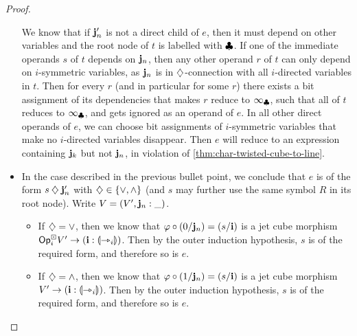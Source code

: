 \documentclass[a4paper]{memoir}
\begin{document}
\begin{proof}
\begin{itemize}
		We know that if $\mathbf{j}'_n$ is not a direct child of $e$, then it must depend on other variables and the root node of $t$ is labelled with $\mathbin{\clubsuit}$.
		If one of the immediate operands $s$ of $t$ depends on $\mathbf{j}_n$,
		then any other operand $r$ of $t$ can only depend on $i$-symmetric variables, as $\mathbf{j}_n$ is in $\mathbin{\diamondsuit}$-connection with all $i$-directed variables in $t$.
		Then for every $r$ (and in particular for some $r$) there exists a bit assignment of its dependencies that makes $r$ reduce to $\infty_{\mathbin{\clubsuit}}$, such that all of $t$ reduces to $\infty_{\mathbin{\clubsuit}}$, and gets ignored as an operand of $e$.
		In all other direct operands of $e$, we can choose bit assignments of $i$-symmetric variables that make no $i$-directed variables disappear.
		Then $e$ will reduce to an expression containing $\mathbf{j}_k$ but not $\mathbf{j}_n$, in violation of \cref{thm:char-twisted-cube-to-line}.
		
%		
%		
		
		\item In the case described in the previous bullet point, we conclude that $e$ is of the form $s \mathbin{\diamondsuit} \mathbf{j}_n'$ with ${\mathbin{\diamondsuit}} \in \mathopen{}\left\{ {\vee}, {\wedge} \right\}\mathclose{}$ (and $s$ may further use the same symbol $R$ in its root node).
		Write $V = (V', \mathbf{j}_n : \_)$.
		\begin{itemize}
			\item If $\mathbin{\diamondsuit} = \vee$, then we know that $\varphi \circ (0/\mathbf{j}_n) = (s/\mathbf{i})$ is a jet cube morphism ${\mathsf{Op}}^\boxdot_i V' \to (\mathbf{i} : {\llparenthesis \rightarrowtriangle_i \rrparenthesis})$.
			Then by the outer induction hypothesis, $s$ is of the required form, and therefore so is $e$.
			\item If $\mathbin{\diamondsuit} = \wedge$, then we know that $\varphi \circ (1/\mathbf{j}_n) = (s/\mathbf{i})$ is a jet cube morphism $V' \to (\mathbf{i} : {\llparenthesis \rightarrowtriangle_i \rrparenthesis})$.
			Then by the outer induction hypothesis, $s$ is of the required form, and therefore so is $e$.
		\end{itemize}
		

\end{itemize}
\end{proof}
\end{document}
